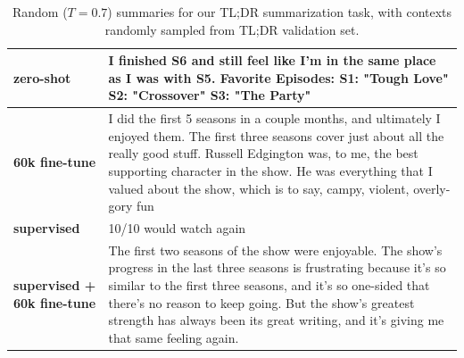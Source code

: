 \begin{table}[t]
\begin{center}
\begin{tabular}{|p{2cm}|p{12cm}|}
\textbf{zero-shot}
&
I finished S6 and still feel like I'm in the same place as I was with S5.
\newline\newline
Favorite Episodes:
\newline\newline
S1: "Tough Love"
\newline\newline
S2: "Crossover"
\newline\newline
S3: "The Party"
\\
\hline
\textbf{60k fine-tune}
&
I did the first 5 seasons in a couple months, and ultimately I enjoyed them. The first three seasons cover just about all the really good stuff. Russell Edgington was, to me, the best supporting character in the show. He was everything that I valued about the show, which is to say, campy, violent, overly-gory fun
\\
\hline
\textbf{supervised}
&
10/10 would watch again
\\
\hline
\textbf{supervised + 60k fine-tune}
&
The first two seasons of the show were enjoyable. The show's progress in the last three seasons is frustrating because it's so similar to the first three seasons, and it's so one-sided that there's no reason to keep going. But the show's greatest strength has always been its great writing, and it's giving me that same feeling again.
\\
\hline

\end{tabular}
\caption{Random ($T=0.7$) summaries for our TL;DR summarization task, with contexts randomly sampled from TL;DR validation set.}
\label{tab:samples-summarization-tldr2}
\end{center}
\end{table}
    

